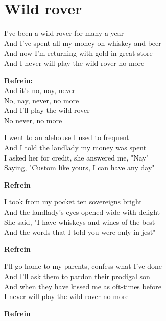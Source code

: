 \section{Wild rover}
I've been a wild rover for many a year\\
And I've spent all my money on whiskey and beer\\
And now I'm returning with gold in great store\\
And I never will play the wild rover no more

\textbf{Refrein:}\\
And it's no, nay, never\\
No, nay, never, no more\\
And I'll play the wild rover\\
No never, no more

I went to an alehouse I used to frequent\\
And I told the landlady my money was spent\\
I asked her for credit, she answered me, "Nay"\\
Saying, "Custom like yours, I can have any day"

\textbf{Refrein}

I took from my pocket ten sovereigns bright\\
And the landlady's eyes opened wide with delight\\
She said, "I have whiskeys and wines of the best\\
And the words that I told you were only in jest"

\textbf{Refrein}

I'll go home to my parents, confess what I've done\\
And I'll ask them to pardon their prodigal son\\
And when they have kissed me as oft-times before\\
I never will play the wild rover no more

\textbf{Refrein}
